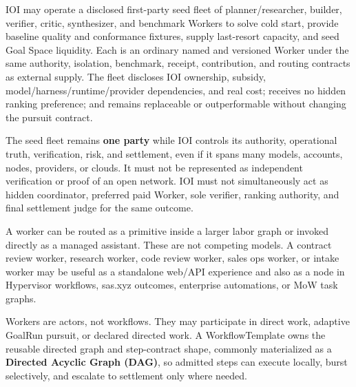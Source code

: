 \documentclass[
  11pt,
]{article}
\begin{document}
IOI may operate a disclosed first-party seed fleet of planner/researcher,
builder, verifier, critic, synthesizer, and benchmark Workers to solve
cold start, provide baseline quality and conformance fixtures, supply
last-resort capacity, and seed Goal Space liquidity. Each is an ordinary
named and versioned Worker under the same authority, isolation, benchmark,
receipt, contribution, and routing contracts as external supply. The
fleet discloses IOI ownership, subsidy, model/harness/runtime/provider
dependencies, and real cost; receives no hidden ranking preference; and
remains replaceable or outperformable without changing the pursuit
contract.

The seed fleet remains \textbf{one party} while IOI controls its
authority, operational truth, verification, risk, and settlement, even
if it spans many models, accounts, nodes, providers, or clouds. It must
not be represented as independent verification or proof of an open
network. IOI must not simultaneously act as hidden coordinator,
preferred paid Worker, sole verifier, ranking authority, and final
settlement judge for the same outcome.

A worker can be routed as a primitive inside a larger labor graph or
invoked directly as a managed assistant. These are not competing models.
A contract review worker, research worker, code review worker, sales ops
worker, or intake worker may be useful as a standalone web/API
experience and also as a node in Hypervisor workflows, sas.xyz outcomes,
enterprise automations, or MoW task graphs.

Workers are actors, not workflows. They may participate in direct work,
adaptive GoalRun pursuit, or declared directed work. A WorkflowTemplate owns
the reusable directed graph and step-contract shape, commonly materialized as
a \textbf{Directed Acyclic Graph (DAG)}, so admitted steps can execute locally,
burst selectively, and escalate to settlement only where needed.


\begin{center}
\end{center}
\end{document}
